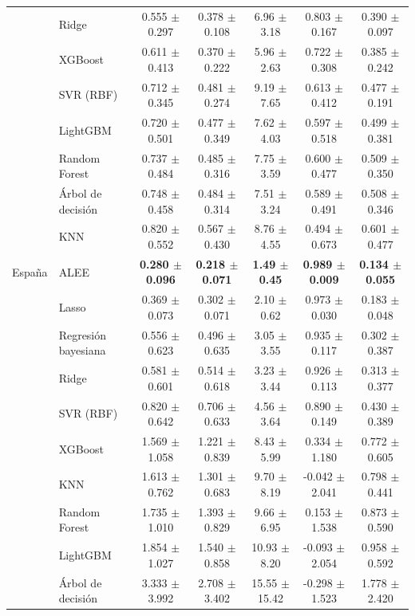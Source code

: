 \begin{longtable}{llccccc}
 & Ridge & 0.555 $\pm$ 0.297 & 0.378 $\pm$ 0.108 & 6.96 $\pm$ 3.18 & 0.803 $\pm$ 0.167 & 0.390 $\pm$ 0.097 \\
 & XGBoost & 0.611 $\pm$ 0.413 & 0.370 $\pm$ 0.222 & 5.96 $\pm$ 2.63 & 0.722 $\pm$ 0.308 & 0.385 $\pm$ 0.242 \\
 & SVR (RBF) & 0.712 $\pm$ 0.345 & 0.481 $\pm$ 0.274 & 9.19 $\pm$ 7.65 & 0.613 $\pm$ 0.412 & 0.477 $\pm$ 0.191 \\
 & LightGBM & 0.720 $\pm$ 0.501 & 0.477 $\pm$ 0.349 & 7.62 $\pm$ 4.03 & 0.597 $\pm$ 0.518 & 0.499 $\pm$ 0.381 \\
 & Random Forest & 0.737 $\pm$ 0.484 & 0.485 $\pm$ 0.316 & 7.75 $\pm$ 3.59 & 0.600 $\pm$ 0.477 & 0.509 $\pm$ 0.350 \\
 & Árbol de decisión & 0.748 $\pm$ 0.458 & 0.484 $\pm$ 0.314 & 7.51 $\pm$ 3.24 & 0.589 $\pm$ 0.491 & 0.508 $\pm$ 0.346 \\
 & KNN & 0.820 $\pm$ 0.552 & 0.567 $\pm$ 0.430 & 8.76 $\pm$ 4.55 & 0.494 $\pm$ 0.673 & 0.601 $\pm$ 0.477 \\
\midrule
España & ALEE & \textbf{0.280 $\pm$ 0.096} & \textbf{0.218 $\pm$ 0.071} & \textbf{1.49 $\pm$ 0.45} & \textbf{0.989 $\pm$ 0.009} & \textbf{0.134 $\pm$ 0.055} \\
 & Lasso & 0.369 $\pm$ 0.073 & 0.302 $\pm$ 0.071 & 2.10 $\pm$ 0.62 & 0.973 $\pm$ 0.030 & 0.183 $\pm$ 0.048 \\
 & Regresión bayesiana & 0.556 $\pm$ 0.623 & 0.496 $\pm$ 0.635 & 3.05 $\pm$ 3.55 & 0.935 $\pm$ 0.117 & 0.302 $\pm$ 0.387 \\
 & Ridge & 0.581 $\pm$ 0.601 & 0.514 $\pm$ 0.618 & 3.23 $\pm$ 3.44 & 0.926 $\pm$ 0.113 & 0.313 $\pm$ 0.377 \\
 & SVR (RBF) & 0.820 $\pm$ 0.642 & 0.706 $\pm$ 0.633 & 4.56 $\pm$ 3.64 & 0.890 $\pm$ 0.149 & 0.430 $\pm$ 0.389 \\
 & XGBoost & 1.569 $\pm$ 1.058 & 1.221 $\pm$ 0.839 & 8.43 $\pm$ 5.99 & 0.334 $\pm$ 1.180 & 0.772 $\pm$ 0.605 \\
 & KNN & 1.613 $\pm$ 0.762 & 1.301 $\pm$ 0.683 & 9.70 $\pm$ 8.19 & -0.042 $\pm$ 2.041 & 0.798 $\pm$ 0.441 \\
 & Random Forest & 1.735 $\pm$ 1.010 & 1.393 $\pm$ 0.829 & 9.66 $\pm$ 6.95 & 0.153 $\pm$ 1.538 & 0.873 $\pm$ 0.590 \\
 & LightGBM & 1.854 $\pm$ 1.027 & 1.540 $\pm$ 0.858 & 10.93 $\pm$ 8.20 & -0.093 $\pm$ 2.054 & 0.958 $\pm$ 0.592 \\
 & Árbol de decisión & 3.333 $\pm$ 3.992 & 2.708 $\pm$ 3.402 & 15.55 $\pm$ 15.42 & -0.298 $\pm$ 1.523 & 1.778 $\pm$ 2.420 \\

\end{longtable}

